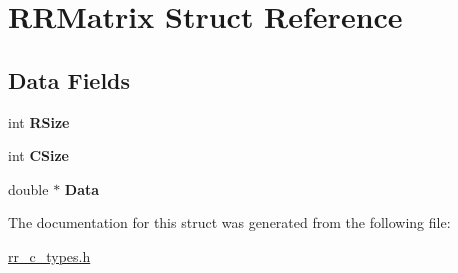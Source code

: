 \hypertarget{struct_r_r_matrix}{
\section{\-R\-R\-Matrix \-Struct \-Reference}
\label{struct_r_r_matrix}
}
\subsection*{\-Data \-Fields}
\begin{DoxyCompactItemize}
\item 
\hypertarget{struct_r_r_matrix_a4d8512c879223c0e0d1522dae38e7819}{
int {\bfseries \-R\-Size}}
\label{struct_r_r_matrix_a4d8512c879223c0e0d1522dae38e7819}

\item 
\hypertarget{struct_r_r_matrix_a17c9a5894aa9cb3789346dcaa9c370bb}{
int {\bfseries \-C\-Size}}
\label{struct_r_r_matrix_a17c9a5894aa9cb3789346dcaa9c370bb}

\item 
\hypertarget{struct_r_r_matrix_a7c5cbda3aa940f4b0d6e8a1679307dfc}{
double $\ast$ {\bfseries \-Data}}
\label{struct_r_r_matrix_a7c5cbda3aa940f4b0d6e8a1679307dfc}

\end{DoxyCompactItemize}


\-The documentation for this struct was generated from the following file\-:\begin{DoxyCompactItemize}
\item 
\hyperlink{rr__c__types_8h}{rr\-\_\-c\-\_\-types.\-h}\end{DoxyCompactItemize}

